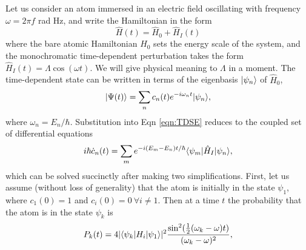 	Let us consider an atom immersed in an electric field oscillating with frequency $\omega = 2 \pi f$ rad Hz, and write the Hamiltonian in the form
	\begin{equation}
		\hat{H}(t) = \hat{H}_0 + \hat{H}_{I}(t)
	\end{equation}
	where the bare atomic Hamiltonian $H_0$ sets the energy scale of the system, and the monochromatic time-dependent perturbation takes the form $\hat{H}_I(t) = \Lambda \cos(\omega t)$. We will give physical meaning to $\Lambda$ in a moment. The time-dependent state can be written in terms of the eigenbasis $|\psi_n\rangle$ of $\hat{H}_0$,
	\begin{equation}
		|\Psi(t)\rangle = \sum_n c_n(t)e^{-i\omega_n t}|\psi_n\rangle,
	\end{equation}
	where $\omega_n= E_n/\hbar$. Substitution into Eqn \ref{eqn:TDSE} reduces to the coupled set of differential equations 
	\begin{equation}
		i\hbar\dot{c}_n(t) = \sum_m e^{-i(E_m-E_n)t/\hbar}\langle\psi_m|\hat{H}_I|\psi_n\rangle,
	\end{equation} 
	which can be solved succinctly after making two simplifications. First, let us assume (without loss of generality) that the atom is initially in the state $\psi_1$, where $c_1(0)=1$ and $c_i(0)=0~\forall i\neq1$. Then at a time $t$ the probability that the atom is in the state $\psi_k$ is \cite{FootAtomic,BinneyBook}
	\begin{equation}
		P_k(t) = 4|\langle\psi_k|H_i|\psi_1\rangle|^2 \frac{\sin^2(\frac{1}{2}(\omega_k-\omega)t)}{(\omega_k-\omega)^2},
	\end{equation}
